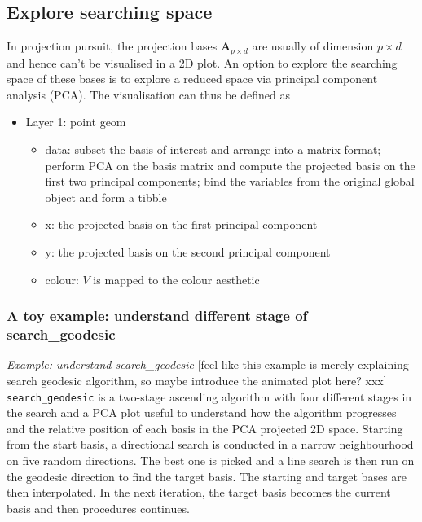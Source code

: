 \documentclass[12pt]{article}
\providecommand{\tightlist}{%
  \setlength{\itemsep}{0pt}\setlength{\parskip}{0pt}}
\begin{document}
\newpage

\hypertarget{animated}{%
\subsection{Explore searching space}\label{animated}}

In projection pursuit, the projection bases \(\mathbf{A}_{p \times d}\)
are usually of dimension \(p \times d\) and hence can't be visualised in
a 2D plot. An option to explore the searching space of these bases is to
explore a reduced space via principal component analysis (PCA). The
visualisation can thus be defined as

\begin{itemize}
\tightlist
\item
  Layer 1: point geom

  \begin{itemize}
  \tightlist
  \item
    data: subset the basis of interest and arrange into a matrix format;
    perform PCA on the basis matrix and compute the projected basis on
    the first two principal components; bind the variables from the
    original global object and form a tibble
  \item
    x: the projected basis on the first principal component
  \item
    y: the projected basis on the second principal component
  \item
    colour: \(V\) is mapped to the colour aesthetic
  \end{itemize}
\end{itemize}

\hypertarget{a-toy-example-understand-different-stage-of-search_geodesic}{%
\subsubsection{A toy example: understand different stage of
search\_geodesic}\label{a-toy-example-understand-different-stage-of-search_geodesic}}

\emph{Example: understand search\_geodesic} {[}feel like this example is
merely explaining search geodesic algorithm, so maybe introduce the
animated plot here? xxx{]} \texttt{search\_geodesic} is a two-stage
ascending algorithm with four different stages in the search and a PCA
plot useful to understand how the algorithm progresses and the relative
position of each basis in the PCA projected 2D space. Starting from the
start basis, a directional search is conducted in a narrow neighbourhood
on five random directions. The best one is picked and a line search is
then run on the geodesic direction to find the target basis. The
starting and target bases are then interpolated. In the next iteration,
the target basis becomes the current basis and then procedures
continues.
\end{document}
